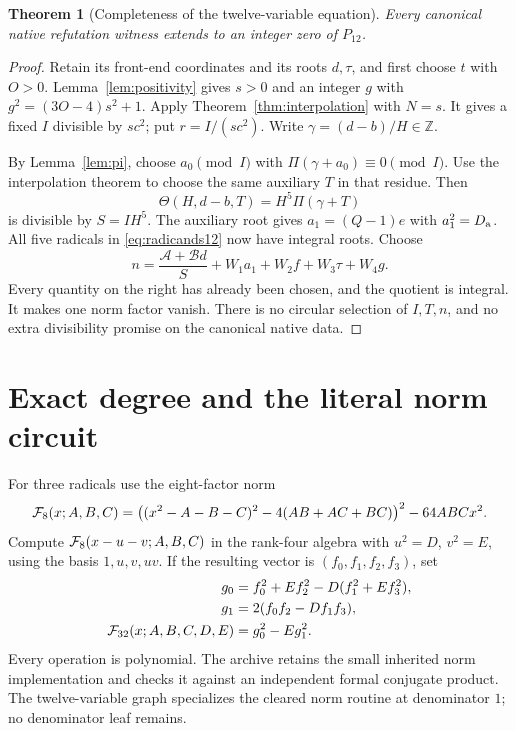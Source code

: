 \documentclass[11pt,a4paper]{article}
\newtheorem{theorem}{Theorem}[section]
\theoremstyle{definition}\newtheorem{definition}[theorem]{Definition}
\theoremstyle{remark}\newtheorem{remark}[theorem]{Remark}
\newcommand{\Z}{\mathbb Z}\newcommand{\Q}{\mathbb Q}\newcommand{\N}{\mathbb N}\newcommand{\R}{\mathbb R}
\numberwithin{equation}{section}
\begin{document}
\begin{theorem}[Completeness of the twelve-variable equation]
Every canonical native refutation witness extends to an integer zero
of $P_{12}$.
\end{theorem}
\begin{proof}
Retain its front-end coordinates and its roots $d,\tau$, and first
choose $t$ with $O>0$. Lemma~\ref{lem:positivity} gives $s>0$ and
an integer $g$ with $g^2=(3O-4)s^2+1$.
Apply Theorem~\ref{thm:interpolation} with $N=s$. It gives a fixed
$I$ divisible by $sc^2$; put $r=I/(sc^2)$. Write
$\gamma=(d-b)/H\in\Z$.

By Lemma~\ref{lem:pi}, choose $a_0\pmod I$ with
$\Pi(\gamma+a_0)\equiv0\pmod I$. Use the interpolation theorem
to choose the same auxiliary $T$ in that residue. Then
\[
 \Theta(H,d-b,T)=H^5\Pi(\gamma+T)
\]
is divisible by $S=IH^5$. The auxiliary root gives
$a_1=(Q-1)e$ with $a_1^2=D_{\mathrm a}$.
All five radicals in \eqref{eq:radicands12} now have integral roots.
Choose
\[
 n=\frac{\mathcal A+\mathcal B d}{S}
       +W_1a_1+W_2f+W_3\tau+W_4g.
\]
Every quantity on the right has already been chosen, and the quotient
is integral. It makes one norm factor vanish. There is no circular
selection of $I,T,n$, and no extra divisibility promise on the canonical
native data.
\end{proof}

\section{Exact degree and the literal norm circuit}
\label{sec:normcircuit}

For three radicals use the eight-factor norm
\begin{equation}
 \mathcal F_8(x;A,B,C)
 =\bigl((x^2-A-B-C)^2-4(AB+AC+BC)\bigr)^2-64ABCx^2.
 \label{eq:norm8}
\end{equation}
Compute $\mathcal F_8(x-u-v;A,B,C)$ in the rank-four algebra
with $u^2=D$, $v^2=E$, using the basis $1,u,v,uv$.
If the resulting vector is $(f_0,f_1,f_2,f_3)$, set
\begin{align*}
 g_0&=f_0^2+Ef_2^2-D(f_1^2+Ef_3^2),\\
 g_1&=2(f_0f_2-Df_1f_3),\\
 \mathcal F_{32}(x;A,B,C,D,E)&=g_0^2-Eg_1^2.
\end{align*}
Every operation is polynomial. The archive retains the small inherited
norm implementation and checks it against an independent formal
conjugate product. The twelve-variable graph specializes the cleared
norm routine at denominator $1$; no denominator leaf remains.
\end{document}
